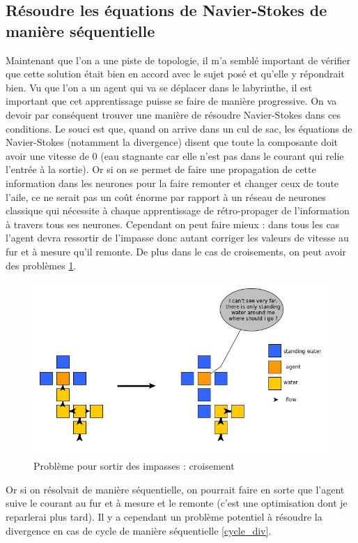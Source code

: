 \documentclass[10pt]{article}
\begin{document}
\subsection{Résoudre les équations de Navier-Stokes de manière séquentielle}
Maintenant que l'on a une piste de topologie, il m'a semblé important de vérifier que cette solution était bien en accord avec le sujet posé et qu'elle y répondrait bien. Vu que l'on a un agent qui va se déplacer dans le labyrinthe, il est important que cet apprentissage puisse se faire de manière progressive. On va devoir par conséquent trouver une manière de résoudre Navier-Stokes dans ces conditions. Le souci est que, quand on arrive dans un cul de sac, les équations de Navier-Stokes (notamment la divergence) disent que toute la composante doit avoir une vitesse de 0 (eau stagnante car elle n'est pas dans le courant qui relie l'entrée à la sortie). Or si on se permet de faire une propagation de cette information dans les neurones pour la faire remonter et changer ceux de toute l'aile, ce ne serait pas un coût énorme par rapport à un réseau de neurones classique qui nécessite à chaque apprentissage de rétro-propager de l'information à travers tous ses neurones. Cependant on peut faire mieux : dans tous les cas l'agent devra ressortir de l'impasse donc autant corriger les valeurs de vitesse au fur et à mesure qu'il remonte. De plus dans le cas de croisements, on peut avoir des problèmes \ref{impasse}.

\begin{figure}[!h]
\centering
\includegraphics[scale=0.45]{question.jpg}
\caption{Problème pour sortir des impasses : croisement}
\label{impasse}
\end{figure}

Or si on résolvait de manière séquentielle, on pourrait faire en sorte que l'agent suive le courant au fur et à mesure et le remonte (c'est une optimisation dont je reparlerai plus tard). Il y a cependant un problème potentiel à résoudre la divergence en cas de cycle de manière séquentielle \ref{cycle_div}. \\
\end{document}
